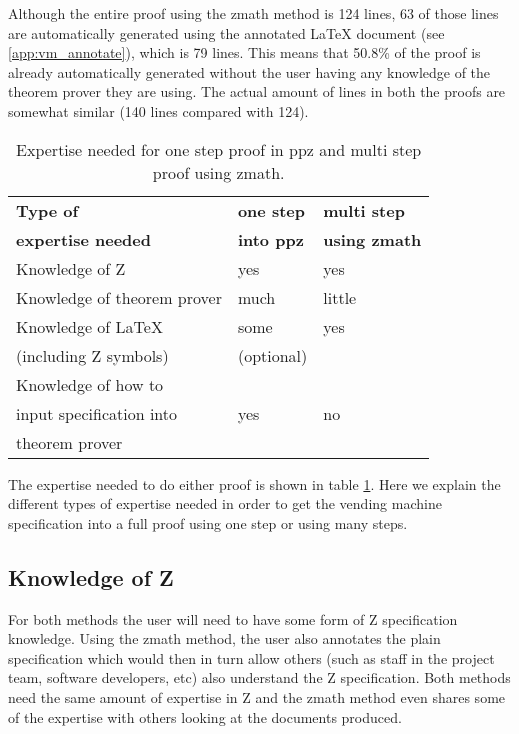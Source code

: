 Although the entire proof using the \gls{zmath} method is 124 lines, 63 of those lines are automatically generated using the annotated \LaTeX{} document (see \ref{app:vm_annotate}), which is 79 lines. This means that 50.8\% of the proof is already automatically generated without the user having any knowledge of the theorem prover they are using. The actual amount of lines in both the proofs are somewhat similar (140 lines compared with 124).

\begin{table}[H]
\begin{center}
\begin{tabular}{| l | l | l |}
\hline
\textbf{Type of} & \textbf{one step} & \textbf{multi step} \\
\textbf{expertise needed} & \textbf{into \gls{ppz}} & \textbf{using \gls{zmath}} \\
\hline
\hline
Knowledge of Z &  yes & yes \\
\hline
Knowledge of theorem prover & much & little \\
\hline
Knowledge of \LaTeX & some & yes \\
(including Z symbols) & (optional) & \\
\hline
Knowledge of how to & & \\
input specification into & yes & no \\
theorem prover & & \\
\hline
\end{tabular}
\end{center}
\caption{Expertise needed for one step proof in \gls{ppz} and multi step proof using \gls{zmath}.}
\label{tab:expertise}
\end{table}

The expertise needed to do either proof is shown in table \ref{tab:expertise}. Here we explain the different types of expertise needed in order to get the vending machine specification into a full proof using one step or using many steps.

\subsection{Knowledge of Z}
For both methods the user will need to have some form of Z specification knowledge. Using the \gls{zmath} method, the user also annotates the plain specification which would then in turn allow others (such as staff in the project team, software developers, etc) also understand the Z specification. Both methods need the same amount of expertise in Z and the \gls{zmath} method even shares some of the expertise with others looking at the documents produced.

